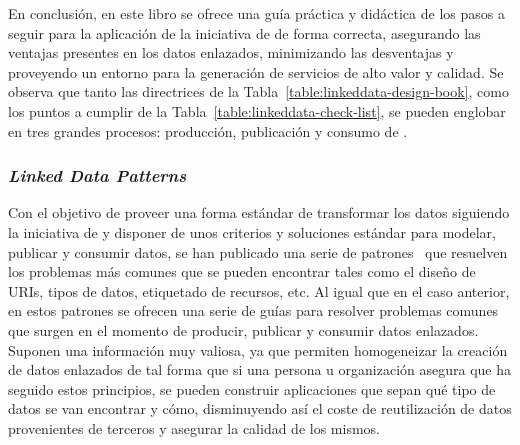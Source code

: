 
En conclusión, en este libro se ofrece una guía práctica y didáctica de los pasos a seguir para la aplicación
de la iniciativa de \linkeddata de forma correcta, asegurando las ventajas presentes en los datos enlazados, minimizando las desventajas
y proveyendo un entorno para la generación de servicios de alto valor y calidad. 
Se observa que tanto las directrices de la Tabla~\ref{table:linkeddata-design-book}, como
los puntos a cumplir de la Tabla~\ref{table:linkeddata-check-list}, se pueden englobar en tres grandes procesos: producción,
publicación y consumo de \linkeddata. 



\subsubsection{\textit{Linked Data Patterns}}\label{linked-data-patterns}
Con el objetivo de proveer una forma estándar de transformar los datos
siguiendo la iniciativa de \linkeddata y disponer de unos criterios y soluciones estándar
para modelar, publicar y consumir datos, se han publicado una serie de patrones~\cite{linked-data-patterns} que resuelven
los problemas más comunes que se pueden encontrar tales como el diseño de URIs, tipos de datos, etiquetado de 
recursos, etc. Al igual que en el caso anterior, en estos patrones se ofrecen una serie de guías para resolver problemas comunes
que surgen en el momento de producir, publicar y consumir datos enlazados. Suponen una información muy valiosa, ya que
permiten homogeneizar la creación de datos enlazados de tal forma que si una persona u organización asegura que ha 
seguido estos principios, se pueden construir aplicaciones que sepan qué tipo de datos se van encontrar y cómo, disminuyendo
así el coste de reutilización de datos provenientes de terceros y asegurar la calidad de los mismos.

